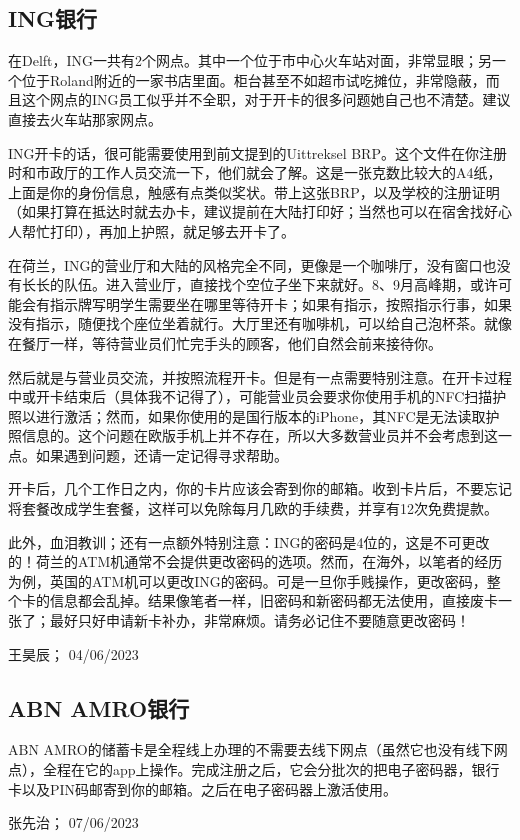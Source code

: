 \subsection{ING银行}
在Delft，ING一共有2个网点。其中一个位于市中心火车站对面，非常显眼；另一个位于Roland附近的一家书店里面。柜台甚至不如超市试吃摊位，非常隐蔽，而且这个网点的ING员工似乎并不全职，对于开卡的很多问题她自己也不清楚。建议直接去火车站那家网点。

ING开卡的话，很可能需要使用到前文提到的Uittreksel BRP。这个文件在你注册时和市政厅的工作人员交流一下，他们就会了解。这是一张克数比较大的A4纸，上面是你的身份信息，触感有点类似奖状。带上这张BRP，以及学校的注册证明（如果打算在抵达时就去办卡，建议提前在大陆打印好；当然也可以在宿舍找好心人帮忙打印），再加上护照，就足够去开卡了。

在荷兰，ING的营业厅和大陆的风格完全不同，更像是一个咖啡厅，没有窗口也没有长长的队伍。进入营业厅，直接找个空位子坐下来就好。8、9月高峰期，或许可能会有指示牌写明学生需要坐在哪里等待开卡；如果有指示，按照指示行事，如果没有指示，随便找个座位坐着就行。大厅里还有咖啡机，可以给自己泡杯茶。就像在餐厅一样，等待营业员们忙完手头的顾客，他们自然会前来接待你。

然后就是与营业员交流，并按照流程开卡。但是有一点需要特别注意。在开卡过程中或开卡结束后（具体我不记得了），可能营业员会要求你使用手机的NFC扫描护照以进行激活；然而，如果你使用的是国行版本的iPhone，其NFC是无法读取护照信息的。这个问题在欧版手机上并不存在，所以大多数营业员并不会考虑到这一点。如果遇到问题，还请一定记得寻求帮助。

开卡后，几个工作日之内，你的卡片应该会寄到你的邮箱。收到卡片后，不要忘记将套餐改成学生套餐，这样可以免除每月几欧的手续费，并享有12次免费提款。

此外，血泪教训；还有一点额外特别注意：ING的密码是4位的，这是不可更改的！荷兰的ATM机通常不会提供更改密码的选项。然而，在海外，以笔者的经历为例，英国的ATM机可以更改ING的密码。可是一旦你手贱操作，更改密码，整个卡的信息都会乱掉。结果像笔者一样，旧密码和新密码都无法使用，直接废卡一张了；最好只好申请新卡补办，非常麻烦。请务必记住不要随意更改密码！
\begin{flushright}
王昊辰； 04/06/2023
\end{flushright}
\subsection{ABN AMRO银行}
ABN AMRO的储蓄卡是全程线上办理的不需要去线下网点（虽然它也没有线下网点），全程在它的app上操作。完成注册之后，它会分批次的把电子密码器，银行卡以及PIN码邮寄到你的邮箱。之后在电子密码器上激活使用。
\begin{flushright}
张先治； 07/06/2023

\end{flushright}



